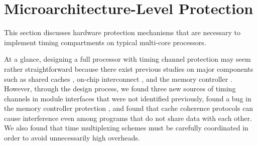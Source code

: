 \section{Microarchitecture-Level Protection}

This section discusses hardware protection mechanisms that are necessary
to implement timing compartments on typical multi-core processors.

At a glance, designing a full processor with timing channel
protection may seem rather straightforward because there exist previous 
studies on major components such as 
shared caches \cite{percival}, 
on-chip interconnect \cite{yaonocs, surfnoc}, and the memory controller \cite{ushpca14}.
However, through the design process, we found three new sources of timing 
channels in module interfaces that were not identified previously, found a
bug in the memory controller protection \cite{ushpca14}, and found that cache 
coherence protocols can cause interference even among programs that do not 
share data with each other.
We also found that time multiplexing schemes
must be carefully coordinated in order to avoid 
unnecessarily high overheads. 

%
%
%
%

